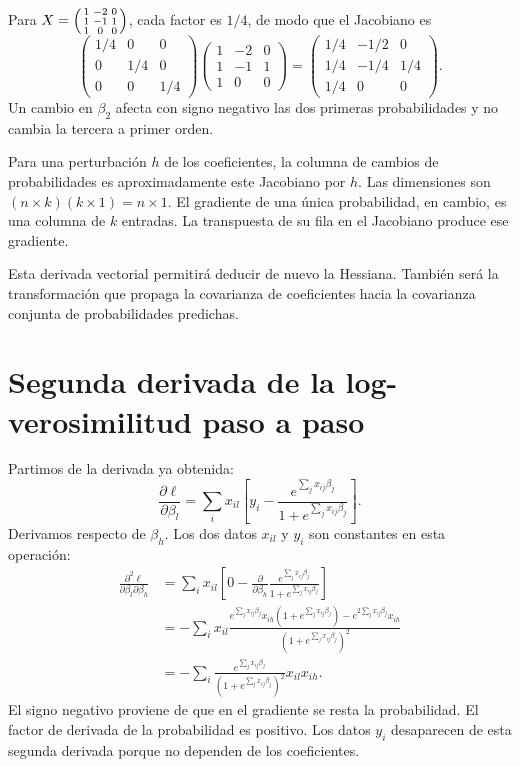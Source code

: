 \documentclass[11pt,a4paper]{article}
\begin{document}
\begin{ejemplo}
Para $X=\begin{psmallmatrix}1&-2&0\\1&-1&1\\1&0&0\end{psmallmatrix}$,
cada factor es $1/4$, de modo que el Jacobiano es
\[
\begin{pmatrix}1/4&0&0\\0&1/4&0\\0&0&1/4\end{pmatrix}
\begin{pmatrix}1&-2&0\\1&-1&1\\1&0&0\end{pmatrix}
=\begin{pmatrix}1/4&-1/2&0\\1/4&-1/4&1/4\\1/4&0&0\end{pmatrix}.
\]
Un cambio en $\beta_2$ afecta con signo negativo las dos primeras
probabilidades y no cambia la tercera a primer orden.
\end{ejemplo}
Para una perturbación $h$ de los coeficientes, la columna de cambios
de probabilidades es aproximadamente este Jacobiano por $h$.
Las dimensiones son $(n\times k)(k\times1)=n\times1$.
El gradiente de una única probabilidad, en cambio, es una columna
de $k$ entradas. La transpuesta de su fila en el Jacobiano produce ese gradiente.

Esta derivada vectorial permitirá deducir de nuevo la Hessiana.
También será la transformación que propaga la covarianza de coeficientes
hacia la covarianza conjunta de probabilidades predichas.

\clearpage
\section{Segunda derivada de la log-verosimilitud paso a paso}\label{logit18}
Partimos de la derivada ya obtenida:
\[
\frac{\partial\ell}{\partial\beta_l}
=\sum_i x_{il}\left[y_i-
\frac{e^{\sum_jx_{ij}\beta_j}}{1+e^{\sum_jx_{ij}\beta_j}}\right].
\]
Derivamos respecto de $\beta_h$. Los dos datos $x_{il}$ y $y_i$
son constantes en esta operación:
\[
\begin{aligned}
\frac{\partial^2\ell}{\partial\beta_l\partial\beta_h}
&=\sum_i x_{il}\left[
0-\frac{\partial}{\partial\beta_h}
\frac{e^{\sum_jx_{ij}\beta_j}}{1+e^{\sum_jx_{ij}\beta_j}}\right]\\
&=-\sum_i x_{il}
\frac{e^{\sum_jx_{ij}\beta_j}x_{ih}
(1+e^{\sum_jx_{ij}\beta_j})
-e^{2\sum_jx_{ij}\beta_j}x_{ih}}
{(1+e^{\sum_jx_{ij}\beta_j})^2}\\
&=\boxed{-\sum_i
\frac{e^{\sum_jx_{ij}\beta_j}}
{(1+e^{\sum_jx_{ij}\beta_j})^2}x_{il}x_{ih}}.
\end{aligned}
\]
El signo negativo proviene de que en el gradiente se resta
la probabilidad. El factor de derivada de la probabilidad es positivo.
Los datos $y_i$ desaparecen de esta segunda derivada
porque no dependen de los coeficientes.
\end{document}
